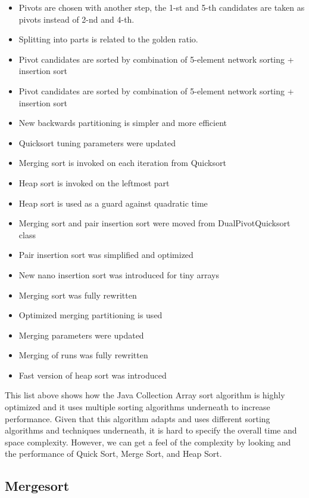 \begin{itemize}
    \item Pivots are chosen with another step, the 1-st and 5-th candidates
   are taken as pivots instead of 2-nd and 4-th.
   \item Splitting into parts is related to the golden ratio.
   \item Pivot candidates are sorted by combination of 5-element
   network sorting + insertion sort
   \item Pivot candidates are sorted by combination of 5-element
   network sorting + insertion sort
   \item New backwards partitioning is simpler and more efficient
   \item Quicksort tuning parameters were updated
   \item Merging sort is invoked on each iteration from Quicksort
   \item Heap sort is invoked on the leftmost part
   \item Heap sort is used as a guard against quadratic time
   \item Merging sort and pair insertion sort were moved from
   DualPivotQuicksort class
   \item Pair insertion sort was simplified and optimized
   \item New nano insertion sort was introduced for tiny arrays
   \item Merging sort was fully rewritten
   \item Optimized merging partitioning is used
   \item Merging parameters were updated
   \item Merging of runs was fully rewritten
   \item Fast version of heap sort was introduced
\end{itemize}

This list above shows how the Java Collection Array sort algorithm is highly optimized and it uses multiple sorting algorithms underneath to increase performance. Given that this algorithm adapts and uses different sorting algorithms and techniques underneath, it is hard to specify the overall time and space complexity. However, we can get a feel of the complexity by looking and the performance of Quick Sort, Merge Sort, and Heap Sort.


\subsection{Mergesort}

